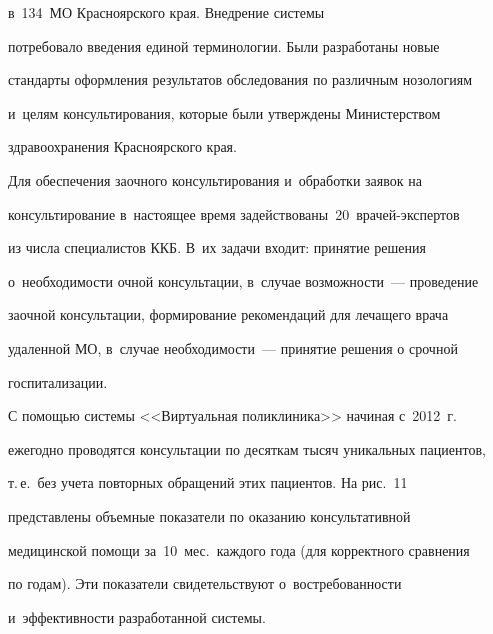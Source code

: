   в~134~МО Красноярского края. Внедрение системы 


потребовало введения единой терминологии. Были разработаны новые 


стандарты оформления результатов обследования по различным нозологиям 


и~целям консультирования, которые были утверждены Министерством 


здравоохранения Красноярского края.


  


  Для обеспечения заочного консультирования и~обработки заявок на 


консультирование в~настоящее время задействованы~20~вра\-чей-экс\-пер\-тов 


из числа специалистов ККБ. В~их задачи входит: принятие решения 


о~необходимости очной консультации, в~случае возможности~--- проведение 


заочной консультации, формирование рекомендаций для лечащего врача 


удаленной МО, в~случае необходимости~--- принятие решения о срочной 


госпитализации. 


  


  С помощью системы <<Виртуальная поликлиника>> начиная с~2012~г.\ 


ежегодно проводятся консультации по десяткам тысяч уникальных пациентов, 


т.\,е.\ без учета повторных обращений этих пациентов. На рис.~11 


представлены объемные показатели по оказанию консультативной 


медицинской помощи за~10~мес.\ каждого года (для корректного сравнения 


по годам). Эти показатели свидетельствуют о~востребованности 


и~эффективности разработанной системы. 


  


